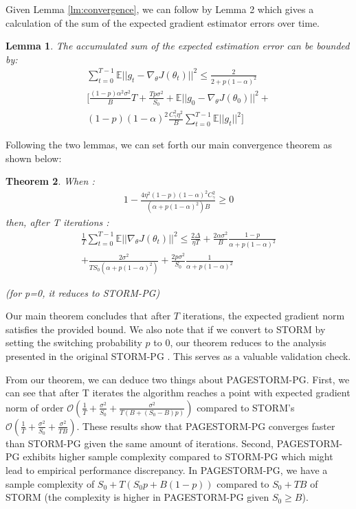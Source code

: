 \documentclass[10pt,twocolumn,letterpaper]{article}
\newtheorem{theorem}{Theorem}[section]
\newtheorem{lemma}[theorem]{Lemma}
\begin{document}
Given Lemma \ref{lm:convergence}, we can follow by Lemma 2 which gives a calculation of the sum of the expected gradient estimator errors over time.

\begin{lemma} \label{lm:sum_exp_error}
The accumulated sum of the expected estimation error can be bounded by:
\begin{equation}
\begin{split}
\sum^{T-1}_{t=0}\mathbb{E}||g_t-\nabla_\theta J(\theta_t)||^2\leq \frac{2}{2+p(1-\alpha)^2} \\
[ \frac{(1-p)\alpha^2\sigma^2}{B}T+
\frac{Tp\sigma^2}{S_0}+\mathbb{E}||g_0-\nabla_\theta J(\theta_0)||^2+ \\ 
(1-p)(1-\alpha)^2\frac{C_\gamma^2\eta^2}{B}\sum_{t=0}^{T-1}\mathbb{E}||g_t||^2]
\end{split}
\end{equation}
\end{lemma}

Following the two lemmas, we can set forth our main convergence theorem as shown below:

\begin{theorem} \label{tm:main_theorem}
When :
\begin{equation}
\begin{split}
1-\frac{4\eta^2(1-p)(1-\alpha)^2C_\gamma^2}{(\alpha+p(1-\alpha)^2)B}\geq0
\end{split}
\end{equation}
then, after T iterations :
\begin{multline*}
\frac{1}{T}\sum_{t=0}^{T-1}\mathbb{E}||\nabla_\theta J(\theta_t)||^2\leq
\frac{2\Delta}{\eta T}
+\frac{2\alpha\sigma^2}{B}\frac{1-p}{\alpha+p(1-\alpha)^2}\\
+\frac{2\sigma^2}{TS_0(\alpha+p(1-\alpha)^2)}
+\frac{2p\sigma^2}{S_0}\frac{1}{\alpha+p(1-\alpha)^2}
\end{multline*}

(for p=0, it reduces to STORM-PG)
\end{theorem}

Our main theorem concludes that after $T$ iterations, the expected gradient norm satisfies the provided bound. 
We also note that if we convert to STORM by setting the switching probability $p$ to 0, our theorem reduces to the analysis presented in the original STORM-PG \cite{stormpaper}. This serves as a valuable validation check. 

From our theorem, we can deduce two things about PAGESTORM-PG. First, we can see that after T iterates the algorithm reaches a point with expected gradient norm of order $\mathcal{O}\left(\frac{1}{T}+\frac{\sigma^{2}}{S_{0}}+\frac{\sigma^{2}}{T (B+(S_0-B)p)}\right)$ compared to STORM's $\mathcal{O}\left(\frac{1}{T}+\frac{\sigma^{2}}{S_{0}}+\frac{\sigma^{2}}{T B}\right)$. These results show that PAGESTORM-PG converges faster than STORM-PG given the same amount of iterations. Second, PAGESTORM-PG exhibits higher sample complexity compared to STORM-PG which might lead to empirical performance discrepancy. In PAGESTORM-PG, we have a sample complexity of $S_{0}+T(S_{0} p+B(1-p))$ compared to $S_{0}+TB$ of STORM (the complexity is higher in PAGESTORM-PG given $S_{0} \geqslant B$).
\end{document}
